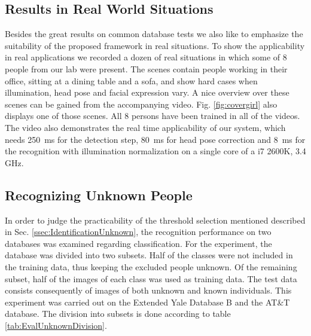 \subsection{Results in Real World Situations}
Besides the great results on common database tests we also like to emphasize the suitability of the proposed framework in real situations. To show the applicability in real applications we recorded a dozen of real situations in which some of 8 people from our lab were present. The scenes contain people working in their office, sitting at a dining table and a sofa, and show hard cases when illumination, head pose and facial expression vary. A nice overview over these scenes can be gained from the accompanying video. Fig. \ref{fig:covergirl} also displays one of those scenes. All 8 persons have been trained in all of the videos. The video also demonstrates the real time applicability of our system, which needs 250~ms for the detection step, 80~ms for head pose correction and 8~ms for the recognition with illumination normalization on a single core of a i7 2600K, 3.4 GHz.

%
%

\subsection{Recognizing Unknown People}
In order to judge the practicability of the threshold selection mentioned described in Sec. \ref{ssec:IdentificationUnknown}, the recognition performance on two databases was examined regarding classification.
For the experiment, the database was divided into two subsets. Half of the classes were not included in the training data, thus keeping the excluded people unknown.
Of the remaining subset, half of the images of each class was used as training data.
The test data consists consequently of images of both unknown and known individuals.
This experiment was carried out on the Extended Yale Database B and the AT\&T database.
The division into subsets is done according to table \ref{tab:EvalUnknownDivision}.

